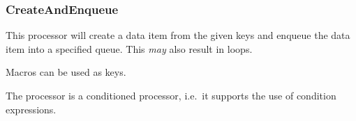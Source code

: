 \subsubsection{CreateAndEnqueue}

This processor will create a data item from the given keys and enqueue
the data item into a specified queue. This \emph{may} also result in
loops.

Macros can be used as keys.

The processor is a conditioned processor, i.e.~it supports the use of
condition expressions.

\begin{table}[h]
\end{table}
